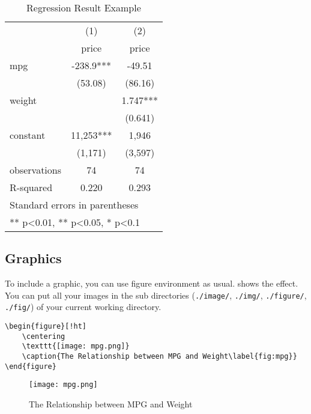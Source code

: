\documentclass{elegantpaper}
\begin{document}
\begin{table}[!htbp]
  \small
  \centering
  \caption{Regression Result Example}
    \begin{tabular}{lll}
    \toprule
          & \multicolumn{1}{c}{(1)} & \multicolumn{1}{c}{(2)} \\
      & \multicolumn{1}{c}{price} & \multicolumn{1}{c}{price} \\
    \midrule
    mpg   & \multicolumn{1}{c}{-238.9***} & \multicolumn{1}{c}{-49.51} \\
          & \multicolumn{1}{c}{(53.08)} & \multicolumn{1}{c}{(86.16)} \\
    weight & \multicolumn{1}{c}{} & \multicolumn{1}{c}{1.747***} \\
          & \multicolumn{1}{c}{} & \multicolumn{1}{c}{(0.641)} \\
    constant & \multicolumn{1}{c}{11,253***} & \multicolumn{1}{c}{1,946} \\
          & \multicolumn{1}{c}{(1,171)} & \multicolumn{1}{c}{(3,597)} \\
    observations & \multicolumn{1}{c}{74} & \multicolumn{1}{c}{74} \\
    R-squared & \multicolumn{1}{c}{0.220} & \multicolumn{1}{c}{0.293} \\
    \midrule
    \multicolumn{3}{l}{\scriptsize Standard errors in parentheses} \\
    \multicolumn{3}{l}{\scriptsize *** p<0.01, ** p<0.05, * p<0.1} \\
    \end{tabular}%
  \label{tab:reg}%
\end{table}%



\subsection{Graphics}
To include a graphic, you can use figure environment as usual.  shows the effect. You can put all your images in the sub directories (\verb|./image/|, \verb|./img/|, \verb|./figure/|, \verb|./fig/|) of your current working directory.

\begin{Verbatim}[tabsize=4,frame=single,baselinestretch=1]
\begin{figure}[!ht]
	\centering
	\texttt{[image: mpg.png]}
	\caption{The Relationship between MPG and Weight\label{fig:mpg}}
\end{figure}
\end{Verbatim}
\begin{figure}[!ht]
	\centering
	\texttt{[image: mpg.png]}
	\caption{The Relationship between MPG and Weight\label{fig:mpg}}
\end{figure}
\end{document}
